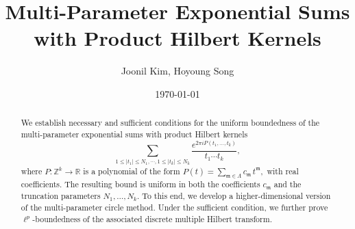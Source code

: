 \documentclass[11 pt,letterpaper]{amsart}
\theoremstyle{plain}
\theoremstyle{definition}
\theoremstyle{remark} \theoremstyle{exam} \theoremstyle{ob}
\numberwithin{equation}{section}
\begin{document}
\title[Multi-Parameter Exponential Sums with Product Hilbert Kernels]
{Multi-Parameter Exponential Sums with Product Hilbert Kernels}

\author
{Joonil Kim,  Hoyoung Song}

\address{Joonil Kim, Department of Mathematics \\
	Yonsei University \\
	Seoul 120-729, Republic of Korea}
\address{Hoyoung Song, Department of Mathematics \\
	Yonsei University \\
	Seoul 120-729, Republic of Korea}






 
 \begin{abstract}
 We establish necessary and sufficient conditions for the uniform boundedness of the multi-parameter exponential sums with product Hilbert kernels
$$
\sum_{1\le|t_1|\le N_1,\cdots,1\le|t_k|\le N_k} \frac{e^{2\pi i P(t_1,\dots,t_k)}}{t_1\cdots t_k},
$$
where $P:\mathbb{Z}^k\to\mathbb{R}$ is a polynomial of the form
$
P(t)=\sum_{\mathfrak{m}\in \Lambda} c_{\mathfrak{m}}\, t^{\mathfrak{m}},
$
with real coefficients. The resulting bound is uniform in both the coefficients
$c_{\mathfrak m}$ and the truncation parameters $N_1,\ldots,N_k$.  To this end, we develop a higher-dimensional version of the multi-parameter circle method.  Under the sufficient condition, we further prove $\ell^p$-boundedness of the associated discrete multiple Hilbert transform.
	\end{abstract}

\date{\today}


\maketitle

\setcounter{tocdepth}{2}
\tableofcontents







 
\end{document}
